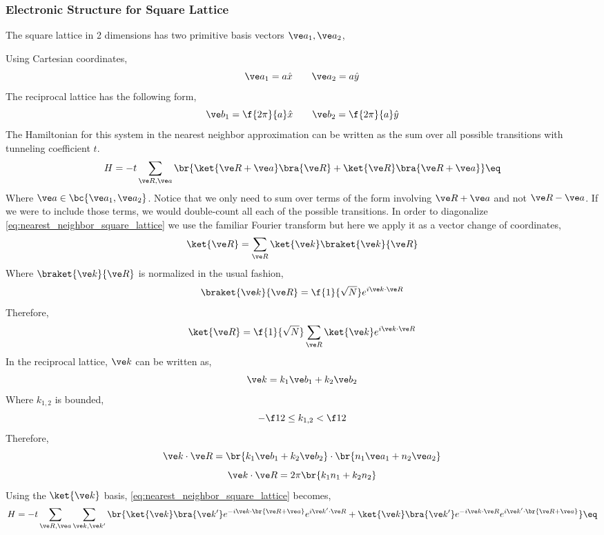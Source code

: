 \documentclass{article}
\begin{document}
\subsubsection{Electronic Structure for Square Lattice}

The square lattice in 2 dimensions has two primitive basis vectors $\ve a_{1}, \ve a_{2}$,
\begin{center}
\end{center}
Using Cartesian coordinates,
\[ \ve a_1 = a \hat x \qquad \ve a_2 = a \hat y \]
The reciprocal lattice has the following form,
\[ \ve b_1 = \f{2 \pi }{a}\hat x \qquad \ve b_2 = \f{2 \pi}{a} \hat y \]
The Hamiltonian for this system in the nearest neighbor approximation can be written as the sum over all possible transitions with tunneling coefficient $t$.
\[ H = - t \sum_{\ve R, \ve a} \br{\ket{\ve R + \ve a} \bra{\ve R} + \ket{\ve R} \bra{\ve R + \ve a}} \eq \label{eq:nearest_neighbor_square_lattice} \]
Where $\ve a \in \bc{\ve a_1, \ve a_2}$. Notice that we only need to sum over terms of the form involving $\ve R + \ve a$ and not $\ve R - \ve a$. If we were to include those terms, we would double-count all each of the possible transitions. In order to diagonalize \cref{eq:nearest_neighbor_square_lattice} we use the familiar Fourier transform but here we apply it as a vector change of coordinates,
\[\ket{\ve R} = \sum_{\ve R} \ket{\ve k} \braket{\ve k}{\ve R} \]
Where $\braket{\ve k}{\ve R}$ is normalized in the usual fashion,
\[ \braket{\ve k}{\ve R} = \f{1}{\sqrt{N}} e^{i \ve k \cdot \ve R} \]
Therefore,
\[\ket{\ve R} = \f{1}{\sqrt{N}} \sum_{\ve R} \ket{\ve k}  e^{i \ve k \cdot \ve R} \]
In the reciprocal lattice, $\ve k$ can be written as,
\[ \ve k = k_1 \ve b_1 + k_2 \ve b_2 \]
Where $k_{1,2}$ is bounded,
\[ -\f12 \leq k_{1,2} < \f12 \]
Therefore,
\[ \ve k \cdot \ve R = \br{k_1 \ve b_1 + k_2 \ve b_2} \cdot \br{n_1 \ve a_1 + n_2 \ve a_2} \]
\[ \ve k \cdot \ve R = 2 \pi \br{k_1 n_1 + k_2 n_2} \]
Using the $\ket{\ve k}$ basis, \cref{eq:nearest_neighbor_square_lattice} becomes,
\[ H = - t \sum_{\ve R, \ve a} \sum_{\ve k, \ve k'} \br{\ket{\ve k}\bra{\ve k'} e^{-i \ve k \cdot \br{\ve R + \ve a}} e^{i \ve k' \cdot \ve R} + \ket{\ve k}\bra{\ve k'} e^{-i \ve k \cdot \ve R} e^{i \ve k' \cdot \br{\ve R + \ve a}}} \eq \label{eq:nearest_neighbor_square_lattice_momentum} \]
\end{document}
